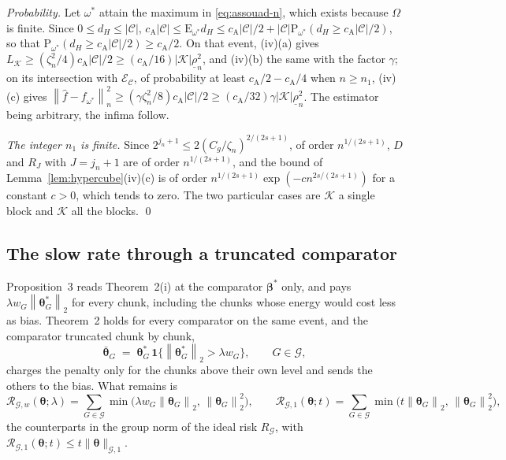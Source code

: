\documentclass[10pt]{book}
\theoremstyle{definition}
\newcommand{\E}{\mathrm{E}}
\newcommand{\Prob}{\mathrm{P}}
\newcommand{\norm}[1]{\left\lVert #1 \right\rVert}
\newcommand{\normn}[1]{\left\lVert #1 \right\rVert_{n}}
\newcommand{\lev}{j}
\newcommand{\btheta}{\boldsymbol{\theta}}
\newcommand{\thetastar}{\btheta^{*}}
\newcommand{\bbeta}{\boldsymbol{\beta}}
\newcommand{\betastar}{\bbeta^{*}}
\newcommand{\pen}{\lambda}
\newcommand{\thbar}{\bar{\btheta}}
\newcommand{\Gcal}{\mathcal{G}}
\newcommand{\nGone}[1]{\lVert #1\rVert_{\mathcal{G},1}}
\newcommand{\Rid}{R_{\mathcal{G}}}
\newcommand{\RGw}{\mathcal{R}_{\mathcal{G},w}}
\newcommand{\RGone}{\mathcal{R}_{\mathcal{G},1}}
\newcommand{\Kcal}{\mathcal{K}}
\newcommand{\rlow}{\underline{\rho}_{n}}
\newcommand{\cA}{c_{\mathrm{A}}}
\begin{document}
{\emph{Probability.} Let $\omega^{*}$ attain the maximum in
\eqref{eq:assouad-n}, which exists because $\Omega$ is finite. Since
$0 \le d_{H} \le |\mathcal{C}|$,
$\cA|\mathcal{C}| \le \E_{\omega^{*}}d_{H} \le \cA|\mathcal{C}|/2 +
|\mathcal{C}|\Prob_{\omega^{*}}(d_{H} \ge \cA|\mathcal{C}|/2)$, so that
$\Prob_{\omega^{*}}(d_{H} \ge \cA|\mathcal{C}|/2) \ge \cA/2$. On that event,
(iv)(a) gives $L_{\Kcal} \ge (\zeta_n^{2}/4)\cA|\mathcal{C}|/2 \ge
(\cA/16)|\Kcal|\rlow^{2}$, and (iv)(b) the same with the factor $\gamma$; on
its intersection with $\mathcal{E}_{\mathcal{C}}$, of probability at least
$\cA/2 - \cA/4$ when $n \ge n_{1}$, (iv)(c) gives
$\normn{\widehat{f}-f_{\omega^{*}}}^{2} \ge
(\gamma\zeta_n^{2}/8)\cA|\mathcal{C}|/2 \ge (\cA/32)\gamma|\Kcal|\rlow^{2}$.
The estimator being arbitrary, the infima follow.

\emph{The integer $n_{1}$ is finite.} Since $2^{\lev_n+1} \le
2(C_g/\zeta_n)^{2/(2s+1)}$, of order $n^{1/(2s+1)}$, $D$ and $R_J$ with
$J = \lev_n + 1$ are of order $n^{1/(2s+1)}$, and the bound of
Lemma~\ref{lem:hypercube}(iv)(c) is of order
$n^{1/(2s+1)}\exp(-cn^{2s/(2s+1)})$ for a constant $c > 0$, which tends to
zero. The two particular cases are $\Kcal$ a single block and $\Kcal$ all the
blocks. \qed

\subsection*{The slow rate through a truncated comparator}

Proposition~3 reads Theorem~2(i) at the comparator $\betastar$ only, and pays
$\pen w_{G}\norm{\thetastar_{G}}_{2}$ for every chunk, including the chunks
whose energy would cost less as bias. Theorem~2 holds for every comparator on
the same event, and the comparator truncated chunk by chunk,
\begin{equation}
  \label{eq:truncated-blocks}
  \thbar_{G} \;=\; \thetastar_{G}\,\mathbf{1}\bigl\{\norm{\thetastar_{G}}_{2}
  > \pen w_{G}\bigr\},
  \qquad G \in \Gcal,
\end{equation}
charges the penalty only for the chunks above their own level and sends the
others to the bias. What remains is
\begin{equation}
  \label{eq:RG}
  \RGw(\btheta;\pen) = \sum_{G\in\Gcal}
  \min\bigl(\pen w_{G}\norm{\btheta_{G}}_{2},\,\norm{\btheta_{G}}_{2}^{2}\bigr),
  \qquad
  \RGone(\btheta;t) = \sum_{G\in\Gcal}
  \min\bigl(t\norm{\btheta_{G}}_{2},\,\norm{\btheta_{G}}_{2}^{2}\bigr),
\end{equation}
the counterparts in the group norm of the ideal risk $\Rid$, with
$\RGone(\btheta;t) \le t\nGone{\btheta}$.

}
\end{document}
